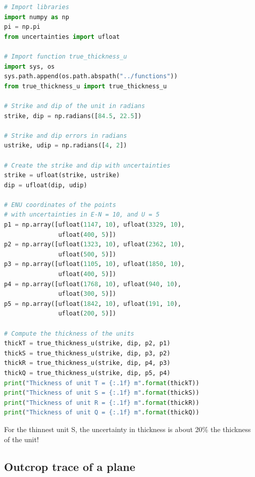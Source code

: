 \documentclass[a4paper , 12pt]{book}
\begin{document}
\begin{center}
\begin{lstlisting}[language=Python, frame=single]
# Import libraries
import numpy as np
pi = np.pi
from uncertainties import ufloat

# Import function true_thickness_u
import sys, os
sys.path.append(os.path.abspath("../functions"))
from true_thickness_u import true_thickness_u

# Strike and dip of the unit in radians
strike, dip = np.radians([84.5, 22.5]) 

# Strike and dip errors in radians
ustrike, udip = np.radians([4, 2]) 

# Create the strike and dip with uncertainties
strike = ufloat(strike, ustrike) 
dip = ufloat(dip, udip)

# ENU coordinates of the points
# with uncertainties in E-N = 10, and U = 5
p1 = np.array([ufloat(1147, 10), ufloat(3329, 10), 
               ufloat(400, 5)]) 
p2 = np.array([ufloat(1323, 10), ufloat(2362, 10), 
               ufloat(500, 5)]) 
p3 = np.array([ufloat(1105, 10), ufloat(1850, 10), 
               ufloat(400, 5)]) 
p4 = np.array([ufloat(1768, 10), ufloat(940, 10), 
               ufloat(300, 5)]) 
p5 = np.array([ufloat(1842, 10), ufloat(191, 10), 
               ufloat(200, 5)])

# Compute the thickness of the units
thickT = true_thickness_u(strike, dip, p2, p1)
thickS = true_thickness_u(strike, dip, p3, p2)
thickR = true_thickness_u(strike, dip, p4, p3)
thickQ = true_thickness_u(strike, dip, p5, p4) 
print("Thickness of unit T = {:.1f} m".format(thickT))
print("Thickness of unit S = {:.1f} m".format(thickS))
print("Thickness of unit R = {:.1f} m".format(thickR))
print("Thickness of unit Q = {:.1f} m".format(thickQ))
\end{lstlisting}
\end{center}

For the thinnest unit S, the uncertainty in thickness is about 20\% the thickness of the unit!

\subsection{Outcrop trace of a plane} \label{outcrop}
\end{document}
